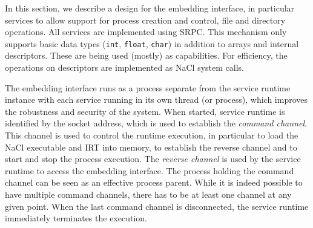 
In this section, we describe a design for the embedding interface, in
particular services to allow support for process creation and control,
file and directory operations.  All services are implemented using SRPC.
This mechanism only supports basic data types (\ie \lstinline`int`,
\lstinline`float`, \lstinline`char`) in addition to arrays and internal
descriptors. These are being used (mostly) as capabilities. For
efficiency, the operations on descriptors are implemented as NaCl system
calls.





The embedding interface runs as a process separate from the service
runtime instance with each service running in its own thread (or
process), which improves the robustness and security of the system. When
started, service runtime is identified by the socket address, which is
used to establish the \emph{command channel}. This channel is used to
control the runtime execution, in particular to load the NaCl executable
and IRT into memory, to establish the reverse channel and to start and
stop the process execution.  The \emph{reverse channel} is used by the
service runtime to access the embedding interface. The process holding
the command channel can be seen as an effective process parent. While it
is indeed possible to have multiple command channels, there has to be at
least one channel at any given point.  When the last command channel is
disconnected, the service runtime immediately terminates the execution.

